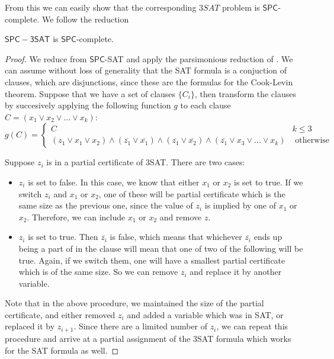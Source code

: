 \documentclass[runningheads,a4paper]{llncs}
\begin{document}
From this we can easily show that the corresponding $3SAT$ problem is $\mathsf{SPC}$-complete. We follow the reduction 

\begin{proposition}
$\mathsf{SPC-3SAT}$ is $\mathsf{SPC}$-complete.
\end{proposition}

\begin{proof}
We reduce from $\mathsf{SPC}$-SAT and apply the parsimonious reduction of \cite{yaleclass}. We can assume without loss of generality that the SAT formula is a conjuction of clauses, which are disjunctions, since these are the formulas for the Cook-Levin theorem. Suppose that we have a set of clauses $\{ C_i \}$, then transform the clauses by succesively applying the following function $g$ to each clause $C = (x_1 \vee x_2 \vee ... \vee x_k)$:
\[ g(C) = \left\{ \begin{array}{cc} C & k \leq 3 \\
						    (z_1 \vee x_1 \vee x_2) \wedge (\overline{z_1} \vee \overline{x_1}) \wedge (\overline{z_1} \vee \overline{x_2}) \wedge (\overline{z_1} \vee x_3 \vee ... \vee x_k) & \text{ otherwise }\end{array} \right. \] 

Suppose $z_i$ is in a partial certificate of 3SAT. There are two cases:
\begin{itemize}
\item $z_i$ is set to false. In this case, we know that either $x_1$ or $x_2$ is set to true. If we switch $z_i$ and $x_1$ or $x_2$, one of these will be partial certificate which is the same size as the previous one, since the value of $z_i$ is implied by one of $x_1$ or $x_2$. Therefore, we can include $x_1$ or $x_2$ and remove $z$.
\item $z_i$ is set to true. Then $\overline{z_i}$ is false, which means that whichever $\overline{z_i}$ ends up being a part of in the clause will mean that one of two of the following will be true. Again, if we switch them, one will have a smallest partial certificate which is of the same size. So we can remove $z_i$ and replace it by another variable. 
\end{itemize}
Note that in the above procedure, we maintained the size of the partial certificate, and either removed $z_i$ and added a variable which was in SAT, or replaced it by $z_{i+1}$. Since there are a limited number of $z_i$, we can repeat this procedure and arrive at a partial assignment of the 3SAT formula which works for the SAT formula as well.
\end{proof}
\end{document}

